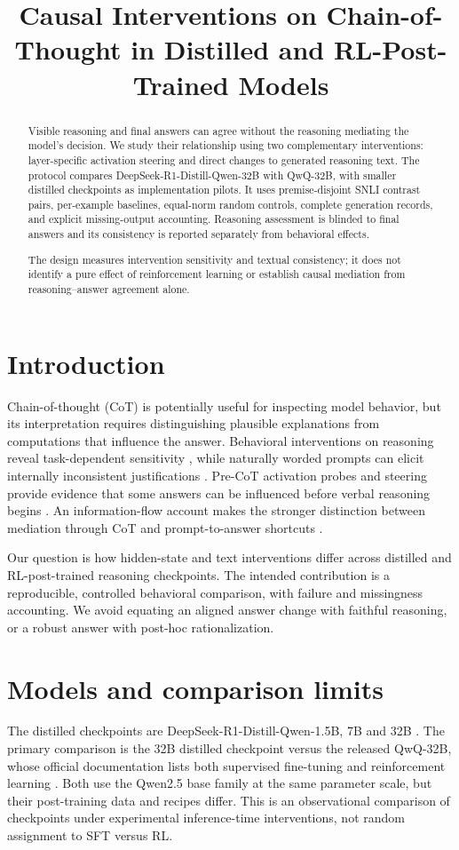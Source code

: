 \documentclass[11pt]{article}
\title{Causal Interventions on Chain-of-Thought in Distilled and RL-Post-Trained Models\StudyStatus}
\author{\StudyAuthors}
\date{\StudyDate}
\begin{document}
\maketitle
\begin{abstract}
Visible reasoning and final answers can agree without the reasoning mediating the
model's decision. We study their relationship using two complementary interventions:
layer-specific activation steering and direct changes to generated reasoning text.
The protocol compares DeepSeek-R1-Distill-Qwen-32B with QwQ-32B, with smaller
distilled checkpoints as implementation pilots. It uses premise-disjoint SNLI contrast
pairs, per-example baselines, equal-norm random controls, complete generation records,
and explicit missing-output accounting. Reasoning assessment is blinded to final
answers and its consistency is reported separately from behavioral effects.

The design measures intervention sensitivity and textual consistency; it does not
identify a pure effect of reinforcement learning or establish causal mediation from
reasoning--answer agreement alone.
\end{abstract}

\section{Introduction}
Chain-of-thought (CoT) is potentially useful for inspecting model behavior, but its
interpretation requires distinguishing plausible explanations from computations that
influence the answer. Behavioral interventions on reasoning reveal task-dependent
sensitivity \cite{lanham2023}, while naturally worded prompts can elicit internally
inconsistent justifications \cite{arcuschin2025}. Pre-CoT activation probes and
steering provide evidence that some answers can be influenced before verbal reasoning
begins \cite{cox2026}. An information-flow account makes the stronger distinction
between mediation through CoT and prompt-to-answer shortcuts \cite{jia2026}.

Our question is how hidden-state and text interventions differ across distilled and
RL-post-trained reasoning checkpoints. The intended contribution is a reproducible,
controlled behavioral comparison, with failure and missingness accounting. We avoid
equating an aligned answer change with faithful reasoning, or a robust answer with
post-hoc rationalization.

\section{Models and comparison limits}
The distilled checkpoints are DeepSeek-R1-Distill-Qwen-1.5B, 7B and 32B
\cite{deepseek2025}. The primary comparison is the 32B distilled checkpoint versus
the released QwQ-32B, whose official documentation lists both supervised fine-tuning
and reinforcement learning \cite{qwq2025}. Both use the Qwen2.5 base family at the
same parameter scale, but their post-training data and recipes differ. This is an
observational comparison of checkpoints under experimental inference-time
interventions, not random assignment to SFT versus RL.
\end{document}
